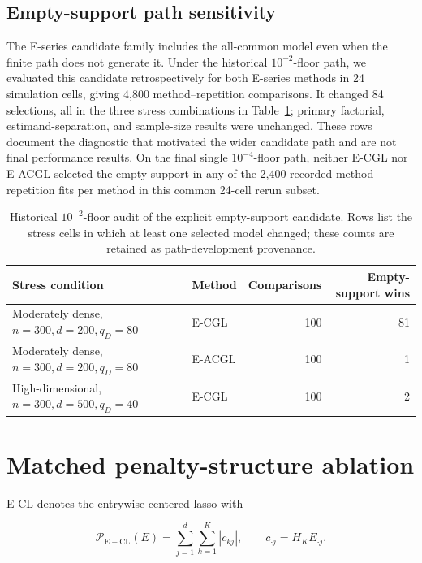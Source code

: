 \documentclass[preprint,12pt,authoryear]{elsarticle}
\begin{document}


\clearpage

\subsection{Empty-support path sensitivity}

The E-series candidate family includes the all-common model even when the
finite path does not generate it. Under the historical $10^{-2}$-floor path,
we evaluated this candidate retrospectively for both E-series methods in 24
simulation cells, giving 4,800 method--repetition comparisons. It changed 84
selections, all in the three stress combinations in
Table~\ref{tab:s-empty-support}; primary factorial, estimand-separation, and
sample-size results were unchanged. These rows document the diagnostic that
motivated the wider candidate path and are not final performance results. On
the final single $10^{-4}$-floor path, neither E-CGL nor E-ACGL selected the
empty support in any of the 2,400 recorded method--repetition fits per method
in this common 24-cell rerun subset.

\begin{table}[H]
\centering
\small
\caption{Historical $10^{-2}$-floor audit of the explicit empty-support
candidate. Rows list the stress cells in which at least one selected model
changed; these counts are retained as path-development provenance.}
\label{tab:s-empty-support}
\begin{tabularx}{\textwidth}{@{}Xlrr@{}}
\toprule
Stress condition & Method & Comparisons & Empty-support wins \\
\midrule
Moderately dense, $n=300,d=200,q_D=80$ & E-CGL  & 100 & 81 \\
Moderately dense, $n=300,d=200,q_D=80$ & E-ACGL & 100 & 1 \\
High-dimensional, $n=300,d=500,q_D=40$ & E-CGL  & 100 & 2 \\
\bottomrule
\end{tabularx}
\end{table}

\section{Matched penalty-structure ablation}
\label{sec:s-penalty-ablation}

E-CL denotes the entrywise centered lasso with

\[
\mathcal P_{\mathrm{E-CL}}(E)
=\sum_{j=1}^d\sum_{k=1}^K|c_{kj}|,
\qquad c_{\cdot j}=H_KE_{\cdot j}.
\]
\end{document}
